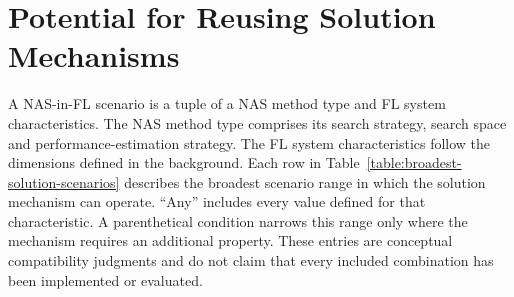 \chapter{Potential for Reusing Solution Mechanisms}\label{chapter:reusable-solution-mechanisms}

A NAS-in-FL scenario is a tuple of a NAS method type and FL system characteristics. The NAS method type comprises its search strategy, search space and performance-estimation strategy. The FL system characteristics follow the dimensions defined in the background. Each row in Table~\ref{table:broadest-solution-scenarios} describes the broadest scenario range in which the solution mechanism can operate. ``Any'' includes every value defined for that characteristic. A parenthetical condition narrows this range only where the mechanism requires an additional property. These entries are conceptual compatibility judgments and do not claim that every included combination has been implemented or evaluated.


